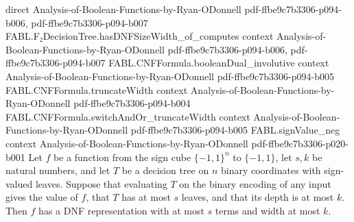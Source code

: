 \begin{theorem}
  {direct}
  {Analysis-of-Boolean-Functions-by-Ryan-ODonnell}
  {pdf-ffbe9c7b3306-p094-b006,
    pdf-ffbe9c7b3306-p094-b007}
\proofstep
  {FABL.F₂DecisionTree.hasDNFSizeWidth_of_computes}
  {context}
  {Analysis-of-Boolean-Functions-by-Ryan-ODonnell}
  {pdf-ffbe9c7b3306-p094-b006,
    pdf-ffbe9c7b3306-p094-b007}
\proofstep
  {FABL.CNFFormula.booleanDual_involutive}
  {context}
  {Analysis-of-Boolean-Functions-by-Ryan-ODonnell}
  {pdf-ffbe9c7b3306-p094-b005}
\proofstep
  {FABL.CNFFormula.truncateWidth}
  {context}
  {Analysis-of-Boolean-Functions-by-Ryan-ODonnell}
  {pdf-ffbe9c7b3306-p094-b004}
\proofstep
  {FABL.CNFFormula.switchAndOr_truncateWidth}
  {context}
  {Analysis-of-Boolean-Functions-by-Ryan-ODonnell}
  {pdf-ffbe9c7b3306-p094-b005}
\proofstep
  {FABL.signValue_neg}
  {context}
  {Analysis-of-Boolean-Functions-by-Ryan-ODonnell}
  {pdf-ffbe9c7b3306-p020-b001}
Let $f$ be a function from the sign cube $\{−1,1\}^n$ to $\{−1,1\}$, let $s,k$ be
natural numbers, and let $T$ be a decision tree on $n$ binary coordinates with
sign-valued leaves. Suppose that evaluating $T$ on the binary encoding of any input
gives the value of $f$, that $T$ has at most $s$ leaves, and that its depth is at most
$k$. Then $f$ has a DNF representation with at most $s$ terms and width at most $k$.
\end{theorem}

